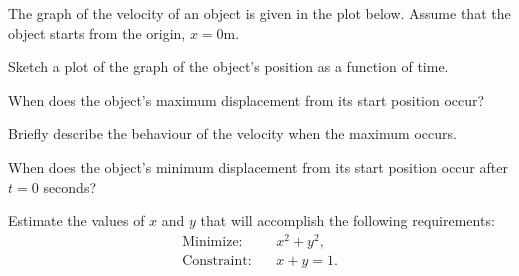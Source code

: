 \begin{problem}
\item The graph of the velocity of an object is given in the plot
  below. Assume that the object starts from the origin, $x=0$m. \\
  \scalebox{0.7}{}
  \begin{subproblem}
  \item Sketch a plot of the graph of the object's position as a
    function of time.
  \item When does the object's maximum displacement from its start
    position occur?
    \vspace{3em}
  \item Briefly describe the behaviour of the velocity when the
    maximum occurs.
    \vfill
  \item When does the object's minimum displacement from its start
    position occur after $t=0$ seconds?
    \vspace{3em}
  \end{subproblem}

  \clearpage

\item Estimate the values of $x$ and $y$ that will accomplish the
  following requirements:
  \begin{eqnarray*}
    \mathrm{Minimize:} & & x^2 + y^2, \\
    \mathrm{Constraint:} & & x + y = 1.
  \end{eqnarray*}
  \label{optimizationMax}

  \vspace{-2.5em}
  \scalebox{0.6}{}


\end{problem}
